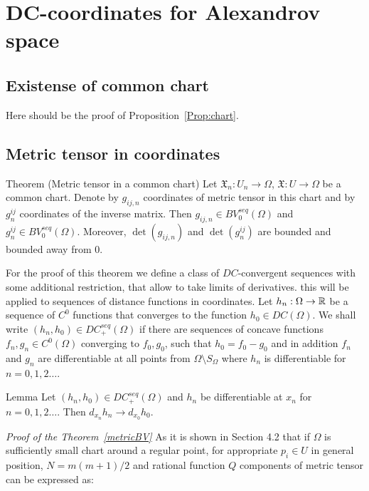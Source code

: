  
\section{DC-coordinates for Alexandrov space}

\subsection{Existense of common chart}\label{NiceChartProof}
Here should be the proof of 
Proposition~\ref{Prop:chart}.
\subsection{Metric tensor  in coordinates}\label{sec:metr-con}

\begin{thm}{Theorem (Metric tensor in a common chart)}\label{metricBV}
Let
$\mathfrak X_n:U_n\to\Omega$,
$\mathfrak X:U\to\Omega$ be a common chart.
Denote by $g_{ij,n}$ coordinates of metric tensor in this chart
and by $g^{ij}_n$ coordinates of the inverse matrix. 
Then
$g_{ij,n}\in BV_0^{seq}(\Omega)$
and
$g^{ij}_n\in BV_0^{seq}(\Omega)$.
Moreover, $\det(g_{ij,n})$ and $\det(g^{ij}_n)$ are bounded and bounded away from 0.

\end{thm}




For the proof of this theorem we define a class of $DC$-convergent sequences with some additional restriction,
that allow to take limits of derivatives.
 this will be applied to sequences of distance functions
in coordinates.
Let $h_n:\Omega\to\mathbb{R}$ be a sequence of $C^0$ functions that
converges to the function $h_0\in DC(\Omega)$.
We shall write
$(h_n, h_0)\in DC_+^{seq}(\Omega)$
if
there are sequences of concave functions $f_n,g_n\in C^0(\Omega)$ converging to
$f_0,g_0$, such that 
$h_0=f_0-g_0$ and in addition $f_n$ and $g_n$
are  differentiable at all points
from $\Omega\setminus S_\Omega$ where $h_n$ is
differentiable for $n=0,1,2\dots$.

 
 
\begin{thm}{Lemma}\label{DC+}
Let
$(h_n, h_0)\in DC_+^{seq}(\Omega)$
and $h_n$ be
differentiable at
$x_n$ for $n=0,1,2\dots$.
Then $d_{x_n}h_n\to d_{x_0}h_0$. 
\end{thm}

{\it Proof of the Theorem~\ref{metricBV} }
As it is shown in \cite{PerDC} Section 4.2
that if $\Omega$ is sufficiently small chart around a regular point,
for appropriate $p_i\in U$ in general position, $N=m(m+1)/2$ and rational function $Q$ components of metric tensor can be expressed as:

